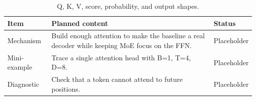 \begin{table}[H]
\centering
\caption{Q, K, V, score, probability, and output shapes.}
\label{tab:ch02-causal-self-attention-as-the-context-path}
\begin{tabularx}{\textwidth}{p{}X p{}}
\toprule
Item & Planned content & Status \\
\midrule
Mechanism & Build enough attention to make the baseline a real decoder while keeping MoE focus on the FFN. & Placeholder \\
Mini-example & Trace a single attention head with B=1, T=4, D=8. & Placeholder \\
Diagnostic & Check that a token cannot attend to future positions. & Placeholder \\
\bottomrule
\end{tabularx}
\end{table}
